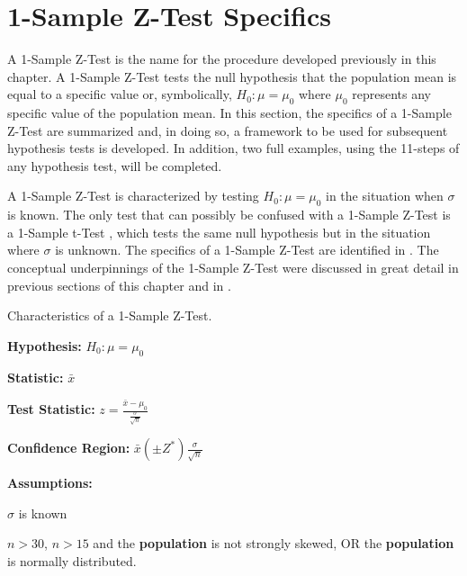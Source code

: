 \documentclass[10pt,openany]{book}\usepackage[]{graphicx}\usepackage[]{color}
\begin{document}

\vspace{-12pt}


\section{1-Sample Z-Test Specifics} \label{sect:ZTest}
A 1-Sample Z-Test is the name for the procedure developed previously in this chapter.  A 1-Sample Z-Test tests the null hypothesis that the population mean is equal to a specific value or, symbolically, $H_{0}:\mu=\mu_{0}$ where $\mu_{0}$ represents any specific value of the population mean.  In this section, the specifics of a 1-Sample Z-Test are summarized and, in doing so, a framework to be used for subsequent hypothesis tests is developed.  In addition, two full examples, using the 11-steps of any hypothesis test, will be completed.

A 1-Sample Z-Test is characterized by testing $H_{0}:\mu=\mu_{0}$ in the situation when $\sigma$ is known.  The only test that can possibly be confused with a 1-Sample Z-Test is a 1-Sample t-Test , which tests the same null hypothesis but in the situation where $\sigma$ is unknown.  The specifics of a 1-Sample Z-Test are identified in .  The conceptual underpinnings of the 1-Sample Z-Test were discussed in great detail in previous sections of this chapter and in .

\begin{table}[htbp]
  \caption{Characteristics of a 1-Sample Z-Test.}
  \label{tab:1Zspec}
    \begin{Itemize}
      \item \textbf{Hypothesis:} $H_{0}:\mu=\mu_{0}$
      \item \textbf{Statistic:} $\bar{x}$
      \vspace{6pt}
      \item \textbf{Test Statistic:} $z=\frac{\bar{x}-\mu_{0}}{\frac{\sigma}{\sqrt{n}}}$
      \vspace{6pt}
      \item \textbf{Confidence Region:} $\bar{x} (\pm Z^{*})\frac{\sigma}{\sqrt{n}}$
      \vspace{6pt}
      \item \textbf{Assumptions:}
        \begin{Enumerate}
          \item $\sigma$ is known
          \item $n>30$, $n>15$ and the \textbf{population} is not strongly skewed, OR the \textbf{population} is normally distributed.
        \end{Enumerate}
    \end{Itemize}
\end{table}
\end{document}
